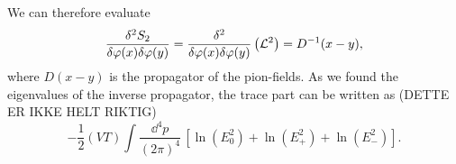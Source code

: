 We can therefore evaluate
\begin{align}
    \frac{\delta^2 S_2}{\delta \varphi(x)\delta \varphi(y)}
    = \frac{\delta^2 }{\delta \varphi(x)\delta \varphi(y)} \left( \mathcal{L}^{2} \right)
    = D^{-1}(x - y),
\end{align}
where $D(x -y)$ is the propagator of the pion-fields.
As we found the eigenvalues of the inverse propagator, the trace part can be written as
(DETTE ER IKKE HELT RIKTIG)
\begin{equation}
    - \frac{1}{2} (VT) \int \frac{\dd^4 p}{(2 \pi )^4} \, 
    \left[ \ln(E_0^2) + \ln(E_+^2) + \ln(E_-^2) \right].
\end{equation}


